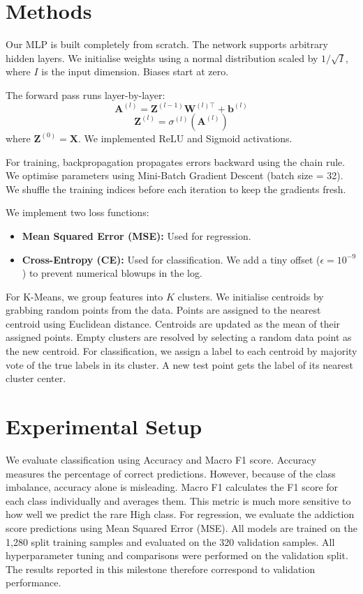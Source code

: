 \documentclass[10pt, twocolumn]{article}
\begin{document}
\section{Methods}
Our MLP is built completely from scratch. The network supports arbitrary hidden layers. We initialise weights using a normal distribution scaled by $1 / \sqrt{I}$, where $I$ is the input dimension. Biases start at zero.

The forward pass runs layer-by-layer:
\begin{equation}
    \mathbf{A}^{(l)} = \mathbf{Z}^{(l-1)}\mathbf{W}^{(l)\top} + \mathbf{b}^{(l)}
\end{equation}
\begin{equation}
    \mathbf{Z}^{(l)} = \sigma^{(l)}(\mathbf{A}^{(l)})
\end{equation}
where $\mathbf{Z}^{(0)} = \mathbf{X}$. We implemented ReLU and Sigmoid activations.

For training, backpropagation propagates errors backward using the chain rule. We optimise parameters using Mini-Batch Gradient Descent (batch size = 32). We shuffle the training indices before each iteration to keep the gradients fresh.

We implement two loss functions:
\begin{itemize}
    \setlength{\itemsep}{0pt}
    \setlength{\parskip}{0pt}
    \item \textbf{Mean Squared Error (MSE):} Used for regression.
    \item \textbf{Cross-Entropy (CE):} Used for classification. We add a tiny offset ($\epsilon = 10^{-9}$) to prevent numerical blowups in the log.
\end{itemize}

For K-Means, we group features into $K$ clusters. We initialise centroids by grabbing random points from the data. Points are assigned to the nearest centroid using Euclidean distance. Centroids are updated as the mean of their assigned points. Empty clusters are resolved by selecting a random data point as the new centroid.
For classification, we assign a label to each centroid by majority vote of the true labels in its cluster. A new test point gets the label of its nearest cluster center.

\section{Experimental Setup}
We evaluate classification using Accuracy and Macro F1 score. Accuracy measures the percentage of correct predictions. However, because of the class imbalance, accuracy alone is misleading. Macro F1 calculates the F1 score for each class individually and averages them. This metric is much more sensitive to how well we predict the rare High class. For regression, we evaluate the addiction score predictions using Mean Squared Error (MSE). All models are trained on the 1,280 split training samples and evaluated on the 320 validation samples. All hyperparameter tuning and comparisons were performed on the validation split. The results reported in this milestone therefore correspond to validation performance.
\end{document}
